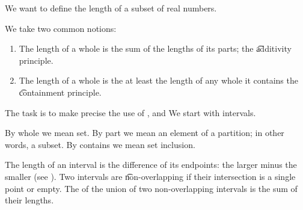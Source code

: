 

We want to define the length of a subset of real numbers.


We take two common notions:

\begin{enumerate}

  \item
  The length of a whole
  is the sum of the lengths
  of its parts;
  the \t{additivity principle}.

  \item
  The length of a whole
  is the at least the length
  of any whole it contains
  the \t{containment principle}.

\end{enumerate}

The task is to make precise the use of , 
and 
We start with intervals.


By whole we mean set.
By part we mean an element of a partition; in other words, a subset.
By contains we mean set inclusion.

The length of an interval is the difference of its endpoints: the larger minus the smaller (see ).
Two intervals are \t{non-overlapping} if their intersection is a single point or empty.
The  of the union of two non-overlapping intervals is the sum of their lengths.

